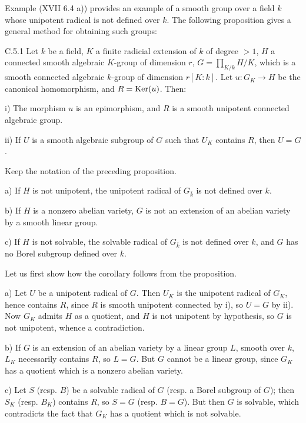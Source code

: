 \label{XVII.C.5}
Example (XVII 6.4 a)) provides an example of a smooth group over a field $k$ whose unipotent radical is not defined over $k$. The following proposition gives a general method for obtaining such groups:
\begin{proposition}{C.5.1}\label{XVII.C.5.1}
Let $k$ be a field, $K$ a finite radicial extension of $k$ of degree $>1$, $H$ a connected smooth algebraic $K$-group of dimension $r$, $G=\prod_{K/k}H/K$, which is a smooth connected algebraic $k$-group of dimension $r[K:k]$. Let $u:G_K\to H$ be the canonical homomorphism, and $R=\operatorname{Ker}(u)$. Then:

\noindent i) The morphism $u$ is an epimorphism, and $R$ is a smooth unipotent connected algebraic group.

\noindent ii) If $U$ is a smooth algebraic subgroup of $G$ such that $U_K$ contains $R$, then $U=G$.
\end{proposition}
\begin{corollary}{}
Keep the notation of the preceding proposition.

\noindent a) If $H$ is not unipotent, the unipotent radical of $G_{\bar k}$ is not defined over $k$.

\noindent b) If $H$ is a nonzero abelian variety, $G$ is not an extension of an abelian variety by a smooth linear group.

\noindent c) If $H$ is not solvable, the solvable radical of $G_{\bar k}$ is not defined over $k$, and $G$ has no Borel subgroup defined over $k$.
\end{corollary}
Let us first show how the corollary follows from the proposition.

\noindent a) Let $U$ be a unipotent radical of $G$. Then $U_K$ is the unipotent radical of $G_K$, hence contains $R$, since $R$ is smooth unipotent connected by i), so $U=G$ by ii). Now $G_K$ admits $H$ as a quotient, and $H$ is not unipotent by hypothesis, so $G$ is not unipotent, whence a contradiction.

\noindent b) If $G$ is an extension of an abelian variety by a linear group $L$, smooth over $k$, $L_K$ necessarily contains $R$, so $L=G$. But $G$ cannot be a linear group, since $G_K$ has a quotient which is a nonzero abelian variety.

\noindent c) Let $S$ (resp. $B$) be a solvable radical of $G$ (resp. a Borel subgroup of $G$); then $S_K$ (resp. $B_K$) contains $R$, so $S=G$ (resp. $B=G$). But then $G$ is solvable, which contradicts the fact that $G_K$ has a quotient which is not solvable.

